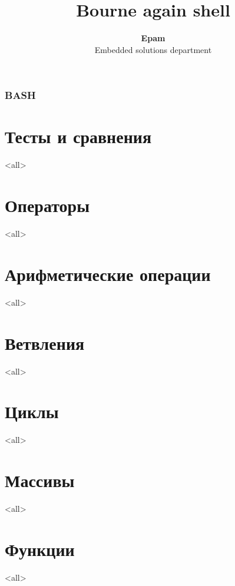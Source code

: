 \documentclass[ignorenonframetext, professionalfonts, hyperref={pdftex, unicode}]{beamer}
\title[bash]{Bourne again shell}
\author[Epam]{{\bf Epam}\\Embedded solutions department}
\begin{document}



\begin{frame}
	\frametitle{BASH}
	\titlepage
	\vspace{-0.5cm}
	\begin{center}
	\end{center}
\end{frame}

\begin{frame}
	\tableofcontents
\end{frame}




\section{Тесты и сравнения}

\mode<all>{}

\section{Операторы}

\mode<all>{}

\section{Арифметические операции}

\mode<all>{}

\section{Ветвления}

\mode<all>{}

\section{Циклы}

\mode<all>{}

\section{Массивы}

\mode<all>{}

\section{Функции}

\mode<all>{}
\end{document}
